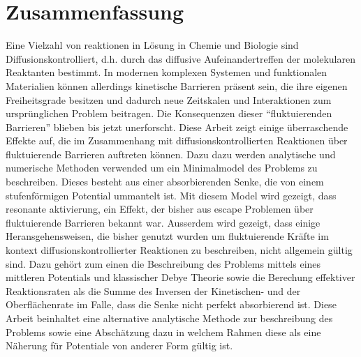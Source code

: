 \section*{Zusammenfassung}
Eine Vielzahl von reaktionen in L\"{o}sung in Chemie und Biologie sind Diffusionskontrolliert, d.h. durch das diffusive Aufeinandertreffen der molekularen Reaktanten bestimmt. In modernen komplexen Systemen und funktionalen Materialien k\"{o}nnen allerdings kinetische Barrieren pr\"{a}sent sein, die ihre eigenen Freiheitsgrade besitzen und dadurch neue Zeitskalen und Interaktionen zum urspr\"{u}nglichen Problem beitragen. Die Konsequenzen dieser ``fluktuierenden Barrieren'' blieben bis jetzt unerforscht.
Diese Arbeit zeigt einige \"{u}berraschende Effekte auf, die im Zusammenhang mit diffusionskontrollierten Reaktionen \"{u}ber fluktuierende Barrieren auftreten k\"{o}nnen. Dazu dazu werden  analytische und numerische Methoden verwended um ein Minimalmodel des Problems zu beschreiben. Dieses besteht aus einer absorbierenden Senke, die von einem stufenf\"{o}rmigen Potential ummantelt ist. Mit diesem Model wird gezeigt, dass resonante aktivierung, ein Effekt, der bisher aus escape Problemen \"{u}ber fluktuierende Barrieren bekannt war. Ausserdem wird gezeigt, dass einige Heransgehensweisen, die bisher genutzt wurden um fluktuierende Kr\"{a}fte im kontext diffusionskontrollierter Reaktionen zu beschreiben, nicht allgemein g\"{u}ltig sind. Dazu geh\"{o}rt zum einen die Beschreibung des Problems mittels eines mittleren Potentials und klassischer Debye Theorie sowie die Berechung effektiver Reaktionsraten als die Summe des Inversen der Kinetischen- und der Oberfl\"{a}chenrate im Falle, dass die Senke nicht perfekt absorbierend ist.
Diese Arbeit beinhaltet eine alternative analytische Methode zur beschreibung des Problems sowie eine Absch\"{a}tzung dazu in welchem Rahmen diese als eine N\"{a}herung f\"{u}r Potentiale von anderer Form g\"{u}ltig ist.
\newpage 
\tableofcontents

\newpage

